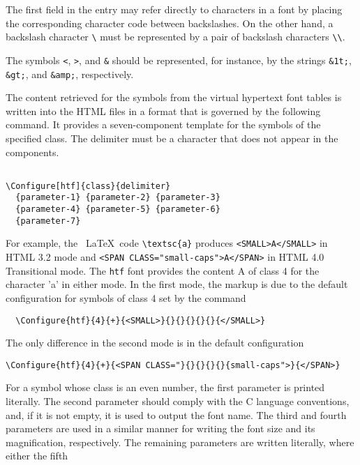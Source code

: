 The first field in the entry may refer directly to characters in a font by
placing the corresponding character code between backslashes. On the other
hand, a backslash character \verb|\| must be represented by a pair of backslash
characters \verb|\\|. 

The symbols \verb|<|, \verb|>|, and \verb|&| should be represented, for
instance, by the strings \verb|&1t;|, \verb|&gt;|, and \verb|&amp;|,
respectively. 


The content retrieved for the symbols from the virtual hypertext font tables is
written into the HTML files in a format that is governed by the following
command.  It provides a seven-component template for the symbols of the
specified class. The delimiter must be a character that does not appear in the
components. 

\begin{lstlisting}

\Configure[htf]{class}{delimiter} 
  {parameter-1} {parameter-2} {parameter-3} 
  {parameter-4} {parameter-5} {parameter-6} 
  {parameter-7} 

\end{lstlisting}

For example, the \ \LaTeX\  code \verb|\textsc{a}| produces \verb|<SMALL>A</SMALL>| in HTML 
3.2 mode and \verb|<SPAN CLASS="small-caps">A</SPAN>| in HTML 4.0 Transitional
mode. The \verb|htf| font provides the content A of class 4 for the character
'a' in either mode. In the first mode, the markup is due to the default
configuration for symbols of class 4 set by the command 

\begin{lstlisting}
  \Configure{htf}{4}{+}{<SMALL>}{}{}{}{}{}{</SMALL>} 
\end{lstlisting}

The only difference in the second mode is in the default configuration 

\begin{lstlisting}
\Configure{htf}{4}{+}{<SPAN CLASS="}{}{}{}{}{small-caps">}{</SPAN>} 
\end{lstlisting}

For a symbol whose class is an even number, the first parameter is printed
literally. The second parameter should comply with the C language conventions,
and, if it is not empty, it is used to output the font name. The third and
fourth parameters are used in a similar manner for writing the font size and
its magnification, respectively. The remaining parameters are written
literally, where either the fifth 
 
